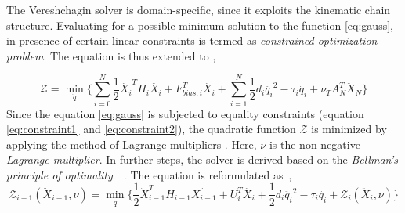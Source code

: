 % 


The Vereshchagin solver is domain-specific, since it exploits the kinematic chain structure. Evaluating for a possible minimum solution to the function \ref{eq:gauss}, in presence of certain linear constraints is termed as \textit{constrained optimization problem}. The equation is thus extended to \cite{shakhimardanov2015composable}, 

 \begin{equation} \label{eq:minimization}
 \mathcal{Z} = \min_{\ddot{q}} \Big \{\sum_{i=0}^{N} \frac{1}{2} \ddot{X_i}^T H_i \ddot{X_i} + F_{bias, i}^T\ddot{X_i} + \sum_{i=1}^{N} \frac{1}{2} d_i \ddot{q_i}^2 - \tau_i \ddot{q_i} + \nu_T A^T_N \ddot{X}_N \Big \}
 \end{equation} 
Since the equation \ref{eq:gauss} is subjected to equality constraints (equation \ref{eq:constraint1} and \ref{eq:constraint2}), the quadratic function $\mathcal{Z}$ is minimized by applying the method of Lagrange multipliers \cite{bertsekas2014constrained}. Here, $\nu$ is the non-negative \textit{Lagrange multiplier}. In further steps, the solver is derived based on the \textit{Bellman's principle of optimality}~\cite{bertsekas1996dynamic}~\cite{bellman2013dynamic}. The equation is reformulated  as~\cite{shakhimardanov2015composable},
 \begin{equation} \label{eq:bellman}
 \mathcal{Z}_{i-1}(\ddot{X}_{i-1}, \nu) = \min_{\ddot{q}} \Big \{ \frac{1}{2} \ddot{X}_{i-1}^T H_{i-1} \ddot{X_{i-1}} + U_i^T\ddot{X_i} + \frac{1}{2} d_i \ddot{q_i}^2 - \tau_i \ddot{q_i} + \mathcal{Z}_i(\ddot{X}_i, \nu)\Big \}
 \end{equation} 
 
